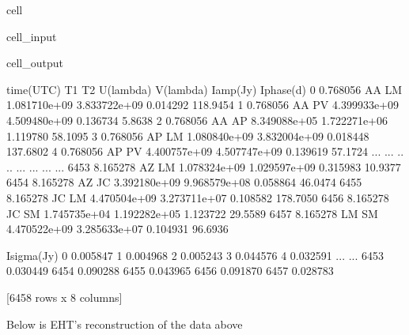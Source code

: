 \documentclass[letterpaper,10pt,english]{jupyterBook}
\begin{document}
\begin{sphinxuseclass}{cell}\begin{sphinxVerbatimInput}

\begin{sphinxuseclass}{cell_input}
\begin{sphinxVerbatim}[commandchars=\\\{\}]
  
   
\end{sphinxVerbatim}

\end{sphinxuseclass}\end{sphinxVerbatimInput}
\begin{sphinxVerbatimOutput}

\begin{sphinxuseclass}{cell_output}
\begin{sphinxVerbatim}[commandchars=\\\{\}]
      \PYGZsh{}time(UTC)  T1  T2     U(lambda)     V(lambda)  Iamp(Jy)  Iphase(d)  \PYGZbs{}
0       0.768056  AA  LM  1.081710e+09 \PYGZhy{}3.833722e+09  0.014292  \PYGZhy{}118.9454   
1       0.768056  AA  PV \PYGZhy{}4.399933e+09 \PYGZhy{}4.509480e+09  0.136734     5.8638   
2       0.768056  AA  AP  8.349088e+05 \PYGZhy{}1.722271e+06  1.119780    58.1095   
3       0.768056  AP  LM  1.080840e+09 \PYGZhy{}3.832004e+09  0.018448  \PYGZhy{}137.6802   
4       0.768056  AP  PV \PYGZhy{}4.400757e+09 \PYGZhy{}4.507747e+09  0.139619   \PYGZhy{}57.1724   
...          ...  ..  ..           ...           ...       ...        ...   
6453    8.165278  AZ  LM \PYGZhy{}1.078324e+09  1.029597e+09  0.315983    10.9377   
6454    8.165278  AZ  JC  3.392180e+09  9.968579e+08  0.058864    46.0474   
6455    8.165278  JC  LM \PYGZhy{}4.470504e+09  3.273711e+07  0.108582  \PYGZhy{}178.7050   
6456    8.165278  JC  SM  1.745735e+04 \PYGZhy{}1.192282e+05  1.123722   \PYGZhy{}29.5589   
6457    8.165278  LM  SM  4.470522e+09 \PYGZhy{}3.285633e+07  0.104931    96.6936   

      Isigma(Jy)  
0       0.005847  
1       0.004968  
2       0.005243  
3       0.044576  
4       0.032591  
...          ...  
6453    0.030449  
6454    0.090288  
6455    0.043965  
6456    0.091870  
6457    0.028783  

[6458 rows x 8 columns]
\end{sphinxVerbatim}

\end{sphinxuseclass}\end{sphinxVerbatimOutput}

\end{sphinxuseclass}
\sphinxAtStartPar
Below is EHT’s reconstruction of the data above
\end{document}
